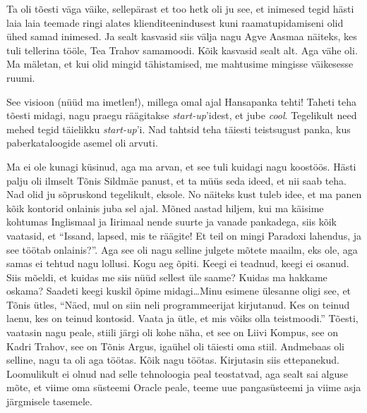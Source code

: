 Ta oli tõesti väga väike, sellepärast et too hetk oli ju see, et inimesed tegid hästi laia laia teemade ringi alates klienditeenindusest kuni raamatupidamiseni olid ühed samad inimesed. Ja sealt kasvasid siis välja nagu Agve Aasmaa näiteks, kes tuli tellerina tööle, Tea Trahov samamoodi. Kõik  kasvasid sealt alt. Aga vähe oli. Ma mäletan, et kui olid mingid tähistamised, me mahtusime mingisse väikesesse ruumi. 


See visioon (nüüd ma imetlen!), millega omal ajal Hansapanka tehti! Taheti teha tõesti midagi, nagu praegu räägitakse \emph{start-up}'idest, et jube \emph{cool}. Tegelikult need mehed tegid täielikku \emph{start-up}'i. Nad tahtsid teha täiesti teistsugust panka, kus  paberkataloogide asemel oli arvuti. 


Ma ei ole kunagi küsinud, aga ma arvan, et see tuli kuidagi nagu koostöös. Hästi palju oli  ilmselt Tõnis Sildmäe panust, et ta müüs seda ideed, et nii saab teha. Nad olid ju sõpruskond tegelikult, eksole. No näiteks kust tuleb idee, et ma panen kõik kontorid onlainis juba sel ajal. Mõned aastad hiljem, kui ma käisime kohtumas Inglismaal ja Iirimaal nende suurte ja vanade pankadega, siis kõik vaatasid, et \enquote{Issand, lapsed, mis te räägite! Et teil on mingi Paradoxi lahendus, ja see töötab onlainis?}. Aga see oli nagu selline julgete mõtete maailm, eks ole, aga samas ei tehtud nagu lollusi. Kogu aeg õpiti. Keegi ei teadnud, keegi ei osanud. Siis mõeldi, et kuidas me siis nüüd sellest üle saame? Kuidas ma hakkame oskama? Saadeti keegi kuskil õpime midagi\dots Minu esimene ülesanne oligi see, et Tõnis ütles, \enquote{Näed, mul on siin neli programmeerijat kirjutanud. Kes on teinud laenu, kes on teinud kontosid. Vaata ja ütle, et mis võiks olla teistmoodi.} Tõesti, vaatasin nagu peale, stiili järgi oli kohe näha, et see on Liivi Kompus, see on Kadri Trahov, see on Tõnis Argus, igaühel oli täiesti oma stiil. Andmebaas oli selline, nagu ta oli aga töötas. Kõik nagu töötas. Kirjutasin siis ettepanekud. Loomulikult ei olnud nad selle tehnoloogia peal teostatvad, aga sealt sai alguse mõte, et viime oma süsteemi Oracle peale, teeme uue pangasüsteemi ja viime asja järgmisele tasemele.

